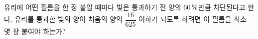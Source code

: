 유리에 어떤 필름을 한 장 붙일 때마다 빛은 통과하기 전 양의 $60\mkern3mu \%$만큼 차단된다고 한다. 유리를 통과한 빛의 양이 처음의 양의 $\dfrac{16}{625}$ 이하가 되도록 하려면 이 필름을 최소 몇 장 붙여야 하는가?
